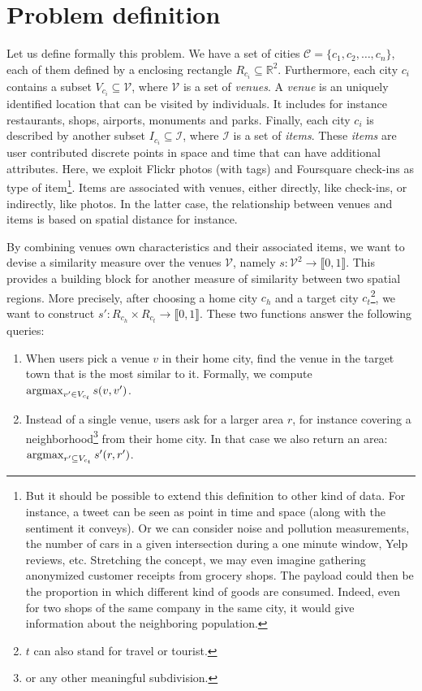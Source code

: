 \section{Problem definition}
\label{sec:problem}

Let us define formally this problem. We have a set of cities $\mathcal{C} =
\{c_1, c_2, \ldots, c_n\}$, each of them defined by a enclosing rectangle
$R_{c_i} \subseteq \mathbb{R}^2$. Furthermore, each city $c_i$ contains a
subset $V_{c_i} \subseteq \mathcal{V}$, where $\mathcal{V}$ is a set of
\emph{venues}. A \emph{venue} is an uniquely identified location that can be
visited by individuals. It includes for instance restaurants, shops, airports,
monuments and parks. Finally, each city $c_i$ is described by another subset
$I_{c_i} \subseteq \mathcal{I}$, where $\mathcal{I}$ is a set of \emph{items}.
These \emph{items} are user contributed discrete points in space and time
that can have additional attributes. Here, we exploit Flickr photos (with
tags) and Foursquare check-ins as type of item\footnote{But it should be
	possible to extend this definition to other kind of data. For
	instance, a tweet can be seen as point in time and space (along with
	the sentiment it conveys). Or we can consider noise and pollution
	measurements, the number of cars in a given intersection during a one
	minute window, Yelp reviews, etc. Stretching the concept, we may even
	imagine gathering anonymized customer receipts from grocery shops.
	The payload could then be the proportion in which different kind of
	goods are consumed. Indeed, even for two shops of the same company in
the same city, it would give information about the neighboring population.}.
Items are associated with venues, either directly, like check-ins, or
indirectly, like photos. In the latter case, the relationship between venues
and items is based on spatial distance for instance.

By combining venues own characteristics and their associated items, we want to
devise a similarity measure over the venues $\mathcal{V}$, namely $s:
\mathcal{V}^2 \rightarrow \llbracket 0, 1 \rrbracket $. This provides a
building block for another measure of similarity between two spatial regions.
More precisely, after choosing a home city $c_h$ and a target city
$c_t$\footnote{$t$ can also stand for travel or tourist.}, we want to
construct $s': R_{c_h} \times R_{c_t} \rightarrow \llbracket 0, 1 \rrbracket$.
These two functions answer the following queries:

\begin{enumerate}
\item When users pick a venue $v$ in their home city, find the venue in the
	target town that is the most similar to it. Formally, we compute
	$\operatorname*{argmax}_{v' \in V_{c_t}} s(v, v')$.\label{q:point}
\item Instead of a single venue, users ask for a larger area $r$, for instance
	covering a neighborhood\footnote{or any other meaningful subdivision.}
	from their home city. In that case we also return an area:
	$\operatorname*{argmax}_{r' \subseteq V_{c_t}} s'(r, r')$.\label{q:space}
\end{enumerate}
